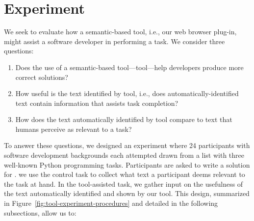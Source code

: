 




\section{Experiment}
\label{cp6:experiment}



We seek to evaluate how a semantic-based tool, i.e., our web browser plug-in, might assist a software developer in performing a task.
We consider three questions:


\begin{enumerate}[label=\textit{RQ}\arabic*]
    \item Does the use of a semantic-based tool---\acs{tool}---help developers produce more correct solutions? 
    \item How useful is the text identified by \acs{tool}, i.e., does  automatically-identified text contain information that assists task completion? 
    \item How does the text automatically identified by \acs{tool} compare to text 
    that humans perceive as relevant to a task?
\end{enumerate}








To answer these questions, we designed an experiment where 24 participants with software development backgrounds each attempted 
 drawn from a list with three well-known Python programming tasks.
Participants are asked to write a solution for .
we use the control task to collect what text a participant deems relevant to the task at hand.
In the tool-assisted task, we gather input on the usefulness of the text automatically identified and shown by our tool. 
This design, summarized in Figure~\ref{fig:tool-experiment-procedures} and detailed in the following subsections,  allow us to:






